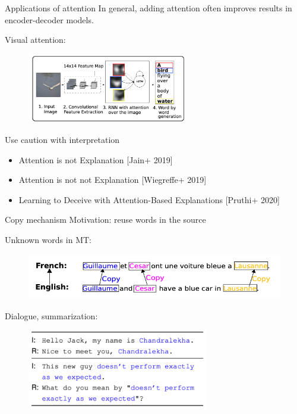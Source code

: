 \documentclass[usenames,dvipsnames,notes]{beamer}
\begin{document}
\begin{frame}
    {Applications of attention}
    In general, adding attention often improves results in encoder-decoder models.

    Visual attention:
    \vspace{-1em}
    \begin{figure}
        \includegraphics[width=7cm]{figures/visual-attention}
    \end{figure}
    \vspace{-1em}

    Use caution with interpretation\\
    \begin{itemize}
        \item[] Attention is not Explanation [Jain+ 2019]
        \item[] Attention is not not Explanation [Wiegreffe+ 2019]
        \item[] Learning to Deceive with Attention-Based Explanations [Pruthi+ 2020]
    \end{itemize}
\end{frame}

\begin{frame}
    {Copy mechanism}
    Motivation: reuse words in the source

    Unknown words in MT:
    \vspace{-1em}
    \begin{figure}
        \includegraphics[height=2cm]{figures/copy-mt}
    \end{figure}
    \vspace{-1em}

    Dialogue, summarization:
    \vspace{-1em}
    \begin{figure}
        \includegraphics[height=3.5cm]{figures/copy-dialogue}
    \end{figure}
    \vspace{-1em}
\end{frame}
\end{document}
